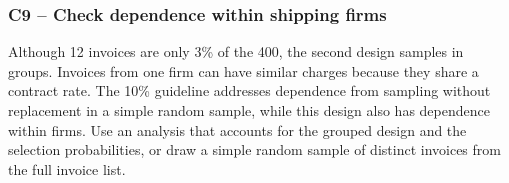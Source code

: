 
	\label{sol:c9-3-b}
	\subsubsection*{C9 -- Check dependence within shipping firms}

	Although 12 invoices are only 3\% of the 400, the second design samples in groups. Invoices from one firm can have similar charges because they share a contract rate. The 10\% guideline addresses dependence from sampling without replacement in a simple random sample, while this design also has dependence within firms. Use an analysis that accounts for the grouped design and the selection probabilities, or draw a simple random sample of distinct invoices from the full invoice list.




